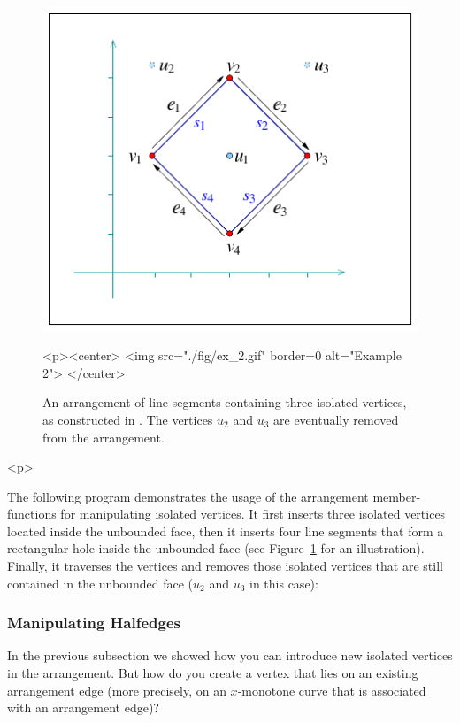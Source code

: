 \begin{figure}[!htp]
\begin{ccTexOnly}
  \begin{center}
  \includegraphics{Arrangement_2/fig/ex_2}
  \end{center}
\end{ccTexOnly}
\begin{ccHtmlOnly}
  <p><center>
  <img src="./fig/ex_2.gif" border=0 alt="Example 2">
  </center>
\end{ccHtmlOnly}
\caption{An arrangement of line segments containing three isolated
vertices, as constructed in . The vertices $u_2$
and $u_3$ are eventually removed from the arrangement.}
\label{arr_fig:ex_2}
\end{figure}

\begin{ccHtmlOnly}<p>\end{ccHtmlOnly}
The following program demonstrates the usage of the arrangement
member-functions for manipulating isolated vertices. It first
inserts three isolated vertices located inside the unbounded face, then
it inserts four line segments that form a rectangular hole inside the
unbounded face (see Figure~\ref{arr_fig:ex_2} for an
illustration). Finally, it traverses the vertices and removes those
isolated vertices that are still contained in the unbounded face
($u_2$ and $u_3$ in this case):


\subsubsection{Manipulating Halfedges}
\label{arr_sssec:mf_halfedges}
%
In the previous subsection we showed how you can introduce new isolated
vertices in the arrangement. But how do you create a vertex that
lies on an existing arrangement edge (more precisely, on an
$x$-monotone curve that is associated with an arrangement edge)?

